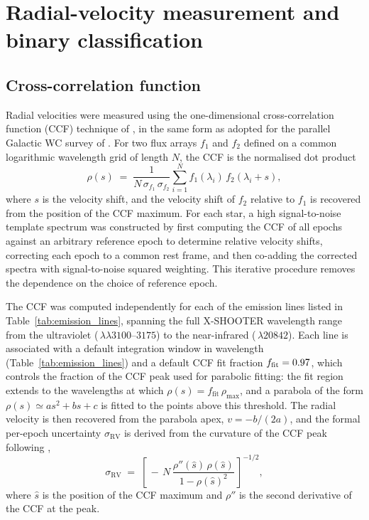 \section{Radial-velocity measurement and binary classification}
\label{sec:methods}

\subsection{Cross-correlation function}
\label{sec:ccf}

Radial velocities were measured using the one-dimensional
cross-correlation function (CCF) technique of \citet{Zucker1994}, in the
same form as adopted for the parallel Galactic WC survey of
\citet{Dsilva2020}. For two flux arrays $f_1$ and $f_2$ defined on a
common logarithmic wavelength grid of length $N$, the CCF is the
normalised dot product
\begin{equation}
\rho(s) \;=\; \frac{1}{N\,\sigma_{f_1}\,\sigma_{f_2}}
              \sum_{i=1}^{N} f_1(\lambda_i)\,f_2(\lambda_i + s),
\end{equation}
where $s$ is the velocity shift, and the velocity shift of $f_2$ relative
to $f_1$ is recovered from the position of the CCF maximum. For each star,
a high signal-to-noise template spectrum was constructed by first
computing the CCF of all epochs against an arbitrary reference epoch to
determine relative velocity shifts, correcting each epoch to a common rest
frame, and then co-adding the corrected spectra with signal-to-noise
squared weighting. This iterative procedure removes the dependence on the
choice of reference epoch.

The CCF was computed independently for each of the \NlinesAll emission
lines listed in Table~\ref{tab:emission_lines}, spanning the full
X-SHOOTER wavelength range from the ultraviolet
(\,$\lambda\lambda 3100$--$3175$) to the near-infrared
(\,$\lambda 20842$). Each line is associated with a default
integration window in wavelength (Table~\ref{tab:emission_lines}) and a
default CCF fit fraction $f_\mathrm{fit} = 0.97$, which
controls the fraction of the CCF peak used for parabolic fitting: the
fit region extends to the wavelengths at which
$\rho(s) = f_\mathrm{fit}\,\rho_{\max}$, and a parabola of the form
$\rho(s) \simeq a s^2 + b s + c$ is fitted to the points above this
threshold. The radial velocity is then recovered from the parabola apex,
$v = -b/(2a)$, and the formal per-epoch uncertainty
$\sigma_\mathrm{RV}$ is derived from the curvature of the CCF peak
following \citet{Zucker2003},
\begin{equation}
\sigma_\mathrm{RV}
   \;=\; \left[\,
     -\,N \,\frac{\rho''(\hat s)\,\rho(\hat s)}{1 - \rho(\hat s)^2}
   \,\right]^{-1/2},
\end{equation}
where $\hat s$ is the position of the CCF maximum and $\rho''$ is the
second derivative of the CCF at the peak.

